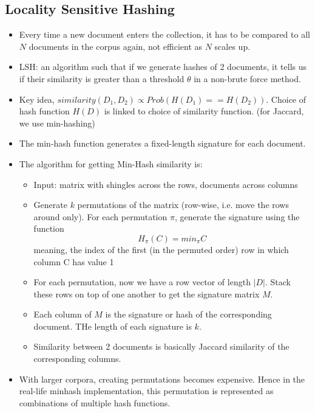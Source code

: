 \documentclass{article}
\begin{document}
\subsection{Locality Sensitive Hashing}
\begin{itemize}
    \item Every time a new document enters the collection, it has to be compared to all $N$ documents in the corpus again, not efficient as $N$ scales up.
    
    \item LSH: an algorithm such that if we generate hashes of 2 documents, it tells us if their similarity is greater than a threshold $\theta$ in a non-brute force method. 
    
    \item Key idea, $similarity(D_1, D_2) \propto Prob(H(D_1) == H(D_2))$. Choice of hash function $H(D)$ is linked to choice of similarity function. (for Jaccard, we use min-hashing)
    
    \item The min-hash function generates a fixed-length signature for each document.
    
    \item The algorithm for getting Min-Hash similarity is:
    \begin{itemize}
        \item Input: matrix with shingles across the rows, documents across columns 
        
        \item Generate $k$ permutations of the matrix (row-wise, i.e. move the rows around only). For each permutation $\pi$, generate the signature using the function
        \begin{equation*}
            H_{\pi}(C) = min_{\pi} C
        \end{equation*}
        meaning, the index of the first (in the permuted order) row in which column C has value 1
        
        \item For each permutation, now we have a row vector of length $|D|$. Stack these rows on top of one another to get the signature matrix $M$.
        
        \item Each column of $M$ is the signature or hash of the corresponding document. THe length of each signature is $k$. 
        
        \item Similarity between 2 documents is basically Jaccard similarity of the corresponding columns.
    \end{itemize}
    
    \item With larger corpora, creating permutations becomes expensive. Hence in the real-life minhash implementation, this permutation is represented as combinations of multiple hash functions.
\end{itemize}
\end{document}
